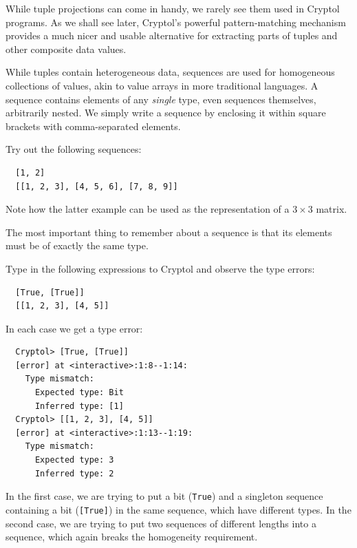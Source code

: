\begin{tip}
  While tuple projections can come in handy, we rarely see them used
  in Cryptol programs. As we shall see later, Cryptol's powerful
  pattern-matching mechanism provides a much nicer and usable
  alternative for extracting parts of tuples and other composite data
  values.
\end{tip}


While tuples contain heterogeneous data, sequences are used for
homogeneous collections of values, akin to value arrays in more
traditional languages.  A sequence contains elements of any
\emph{single} type, even sequences themselves, arbitrarily nested.  We
simply write a sequence by enclosing it within square brackets with
comma-separated elements.\indTheSequenceType


\begin{Exercise}\label{ex:seq:1}
Try out the following sequences:
\begin{Verbatim}
  [1, 2]
  [[1, 2, 3], [4, 5, 6], [7, 8, 9]]
\end{Verbatim}
Note how the latter example can be used as the representation of a
$3\times3$ matrix.
\end{Exercise}

\begin{tip}
  The most important thing to remember about a sequence is that its
  elements must be of exactly the same type.
\end{tip}

\begin{Exercise}\label{ex:seq:2}
  Type in the following expressions to Cryptol and observe the
  type errors:
\begin{Verbatim}
  [True, [True]]
  [[1, 2, 3], [4, 5]]
\end{Verbatim}
\end{Exercise}
\begin{Answer}
In each case we get a type error:
\begin{Verbatim}
  Cryptol> [True, [True]]
  [error] at <interactive>:1:8--1:14:
    Type mismatch:
      Expected type: Bit
      Inferred type: [1]
  Cryptol> [[1, 2, 3], [4, 5]]
  [error] at <interactive>:1:13--1:19:
    Type mismatch:
      Expected type: 3
      Inferred type: 2
\end{Verbatim}
In the first case, we are trying to put a bit (\texttt{True}) and a
singleton sequence containing a bit (\texttt{[True]}) in the same
sequence, which have different types. In the second case, we are
trying to put two sequences of different lengths into a sequence,
which again breaks the homogeneity requirement.
\end{Answer}


